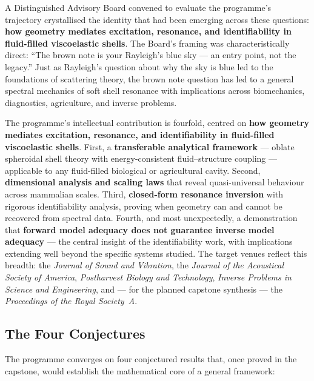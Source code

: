 \documentclass[11pt,a4paper]{article}
\begin{document}
A Distinguished Advisory Board convened to evaluate the programme's trajectory crystallised the identity that had been emerging across these questions: \textbf{how geometry mediates excitation, resonance, and identifiability in fluid-filled viscoelastic shells}. The Board's framing was characteristically direct: ``The brown note is your Rayleigh's blue sky --- an entry point, not the legacy.'' Just as Rayleigh's question about why the sky is blue led to the foundations of scattering theory, the brown note question has led to a general spectral mechanics of soft shell resonance with implications across biomechanics, diagnostics, agriculture, and inverse problems.

The programme's intellectual contribution is fourfold, centred on \textbf{how geometry mediates excitation, resonance, and identifiability in fluid-filled viscoelastic shells}. First, a \textbf{transferable analytical framework} --- oblate spheroidal shell theory with energy-consistent fluid--structure coupling --- applicable to any fluid-filled biological or agricultural cavity. Second, \textbf{dimensional analysis and scaling laws} that reveal quasi-universal behaviour across mammalian scales. Third, \textbf{closed-form resonance inversion} with rigorous identifiability analysis, proving when geometry can and cannot be recovered from spectral data. Fourth, and most unexpectedly, a demonstration that \textbf{forward model adequacy does not guarantee inverse model adequacy} --- the central insight of the identifiability work, with implications extending well beyond the specific systems studied. The target venues reflect this breadth: the \emph{Journal of Sound and Vibration}, the \emph{Journal of the Acoustical Society of America}, \emph{Postharvest Biology and Technology}, \emph{Inverse Problems in Science and Engineering}, and --- for the planned capstone synthesis --- the \emph{Proceedings of the Royal Society~A}.

\subsection{The Four Conjectures}

The programme converges on four conjectured results that, once proved in the capstone, would establish the mathematical core of a general framework:
\end{document}

